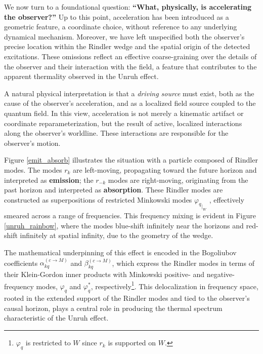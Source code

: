 \documentclass[12pt,a4paper]{article}
\begin{document}
We now turn to a foundational question: {\bf ``What, physically, is accelerating the observer?''} Up to this point, acceleration has been introduced as a geometric feature, a coordinate choice, without reference to any underlying dynamical mechanism. Moreover, we have left unspecified both the observer’s precise location within the Rindler wedge and the spatial origin of the detected excitations. These omissions reflect an effective coarse-graining over the details of the observer and their interaction with the field, a feature that contributes to the apparent thermality observed in the Unruh effect.

A natural physical interpretation is that a {\it driving source} must exist, both as the cause of the observer’s acceleration, and as a localized field source coupled to the quantum field. In this view, acceleration is not merely a kinematic artifact or coordinate reparameterization, but the result of active, localized interactions along the observer’s worldline. These interactions are responsible for the observer’s motion.

Figure \ref{emit_absorb} illustrates the situation with a particle composed of Rindler modes. The modes $r_k$ are left-moving, propagating toward the future horizon and interpreted as {\bf emission}; the $r_{-k}$ modes are right-moving, originating from the past horizon and interpreted as {\bf absorption}. These Rindler modes are constructed as superpositions of restricted Minkowski modes ${\varphi_q}_{|_W}$ , effectively smeared across a range of frequencies.  This frequency mixing is evident in Figure \ref{unruh_rainbow}, where the modes blue-shift infinitely near the horizons and red-shift infinitely at spatial infinity, due to the geometry of the wedge.

The mathematical underpinning of this effect is encoded in the Bogoliubov coefficients $\alpha_{kq}^{(c \rightarrow M)}$ and $\beta_{kq}^{(c \rightarrow M)}$, which express the Rindler modes in terms of their Klein-Gordon inner products with Minkowski positive- and negative-frequency modes, $\varphi_q$ and $\varphi_q^*$, respectively\footnote{$\varphi_q$ is restricted to $W$ since $r_k$ is supported on $W$.}. This delocalization in frequency space, rooted in the extended support of the Rindler modes and tied to the observer’s causal horizon, plays a central role in producing the thermal spectrum characteristic of the Unruh effect.
\end{document}
